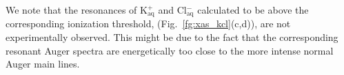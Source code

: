 {\color{blue} We note that the resonances of K$^{+}_{\text{aq}}$ and Cl$^{-}_{\text{aq}}$ calculated to be above the corresponding ionization threshold, (Fig.\ \ref{fg:xas_kcl}(c,d)), are not experimentally observed. This might be due to the fact that the corresponding resonant Auger spectra are energetically too close to the more intense normal Auger main lines.}








